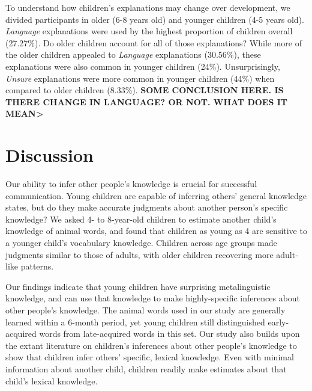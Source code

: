 \documentclass[10pt, letterpaper]{article}
\begin{document}
To understand how children's explanations may change over development,
we divided participants in older (6-8 years old) and younger children
(4-5 years old). \emph{Language} explanations were used by the highest
proportion of children overall (27.27\%). Do older children account for
all of those explanations? While more of the older children appealed to
\emph{Language} explanations (30.56\%), these explanations were also
common in younger children (24\%). Unsurprisingly, \emph{Unsure}
explanations were more common in younger children (44\%) when compared
to older children (8.33\%). \textbf{SOME CONCLUSION HERE. IS THERE
CHANGE IN LANGUAGE? OR NOT. WHAT DOES IT MEAN\textgreater{}}

\hypertarget{discussion}{%
\section{Discussion}\label{discussion}}

Our ability to infer other people's knowledge is crucial for successful
communication. Young children are capable of inferring others' general
knowledge states, but do they make accurate judgments about another
person's specific knowledge? We asked 4- to 8-year-old children to
estimate another child's knowledge of animal words, and found that
children as young as 4 are sensitive to a younger child's vocabulary
knowledge. Children across age groups made judgments similar to those of
adults, with older children recovering more adult-like patterns.

Our findings indicate that young children have surprising metalinguistic
knowledge, and can use that knowledge to make highly-specific inferences
about other people's knowledge. The animal words used in our study are
generally learned within a 6-month period, yet young children still
distinguished early-acquired words from late-acquired words in this set.
Our study also builds upon the extant literature on children's
inferences about other people's knowledge to show that children infer
others' specific, lexical knowledge. Even with minimal information about
another child, children readily make estimates about that child's
lexical knowledge.
\end{document}
